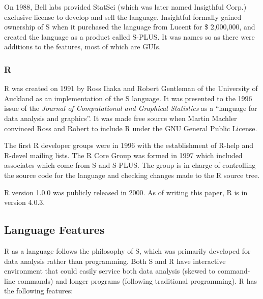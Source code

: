 \documentclass[12pt]{article}
\begin{document}
On 1988, Bell labs provided StatSci (which was later named Insigthful Corp.) exclusive license to develop and sell the language. Insightful formally gained ownership of S when it purchased the language from Lucent for \$ 2,000,000, and created the language as a product called S-PLUS. It was names so as there were additions to the features, most of which are GUIs.

\subsubsection{R}
R was created on 1991 by Ross Ihaka and Robert Gentleman of the University of Auckland as an implementation of the S language. It was presented to the 1996 issue of the \textit{Journal of Computational and Graphical Statistics} as a ``language for data analysis and graphics''. It was made free source when Martin Machler convinced Ross and Robert to include R under the GNU General Public License.

The first R developer groups were in 1996 with the establishment of R-help and R-devel mailing lists. The R Core Group was formed in 1997 which included associates which come from S and S-PLUS. The group is in charge of controlling the source code for the language and checking changes made to the R source tree.

R version 1.0.0 was publicly released in 2000. As of writing this paper, R is in version 4.0.3.
\subsection{Language Features}
R as a language follows the philosophy of S, which was primarily developed for data analysis rather than programming. Both S and R have interactive environment that could easily service both data analysis (skewed to command-line commands) and longer programs (following traditional programming). R has the following features:
\end{document}
